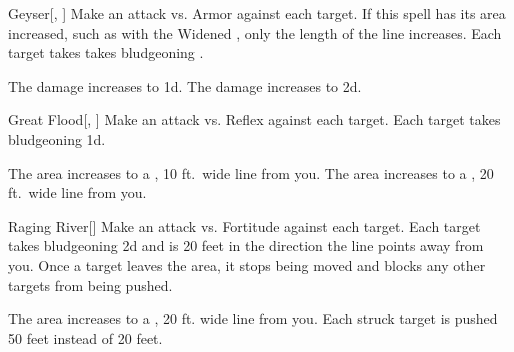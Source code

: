 \lowercase{\hypertarget{spell:Geyser}{}}\label{spell:Geyser}
\begin{freeability}[Rank 3]{\hypertarget{spell:Geyser}{Geyser}}[, ]
Make an attack vs. Armor against each target.
If this spell has its area increased, such as with the Widened , only the length of the line increases.
\hit Each target takes takes bludgeoning .

\rankline
{} The damage increases to  \plus1d.
 The damage increases to  \plus2d.

\end{freeability}
\vspace{0.25em}



\lowercase{\hypertarget{spell:Great Flood}{}}\label{spell:Great Flood}
\begin{freeability}[Rank 3]{\hypertarget{spell:Great Flood}{Great Flood}}[, ]
Make an attack vs. Reflex against each target.
\hit Each target takes bludgeoning  \minus1d.

\rankline
{} The area increases to a \areahuge, 10 ft.\ wide line from you.
 The area increases to a \areahuge, 20 ft.\ wide line from you.

\end{freeability}
\vspace{0.25em}



\lowercase{\hypertarget{spell:Raging River}{}}\label{spell:Raging River}
\begin{freeability}[Rank 3]{\hypertarget{spell:Raging River}{Raging River}}[]
Make an attack vs. Fortitude against each target.
\hit Each target takes bludgeoning  \minus2d and is  20 feet in the direction the line points away from you.
Once a target leaves the area, it stops being moved and blocks any other targets from being pushed.

\rankline
 The area increases to a \areahuge, 20 ft. wide line from you.
 Each struck target is pushed 50 feet instead of 20 feet.

\end{freeability}
\vspace{0.25em}



